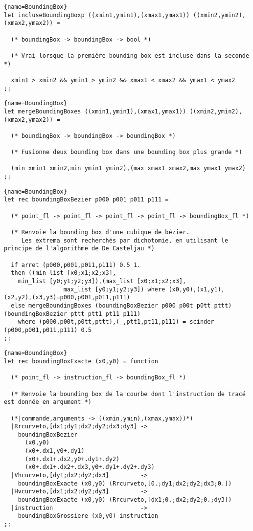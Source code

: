 \documentclass[10pt,twoside,a4paper]{article}
\begin{document}
\begin{lstlisting}{name=BoundingBox}
let incluseBoundingBoxp ((xmin1,ymin1),(xmax1,ymax1)) ((xmin2,ymin2),(xmax2,ymax2)) =

  (* boundingBox -> boundingBox -> bool *)

  (* Vrai lorsque la première bounding box est incluse dans la seconde *)
  
  xmin1 > xmin2 && ymin1 > ymin2 && xmax1 < xmax2 && ymax1 < ymax2
;;
\end{lstlisting}
\pagebreak
\begin{lstlisting}{name=BoundingBox}
let mergeBoundingBoxes ((xmin1,ymin1),(xmax1,ymax1)) ((xmin2,ymin2),(xmax2,ymax2)) =

  (* boundingBox -> boundingBox -> boundingBox *)

  (* Fusionne deux bounding box dans une bounding box plus grande *)
  
  (min xmin1 xmin2,min ymin1 ymin2),(max xmax1 xmax2,max ymax1 ymax2)
;;
\end{lstlisting}
\lstset{frame=single}
\begin{lstlisting}{name=BoundingBox}
let rec boundingBoxBezier p000 p001 p011 p111 =

  (* point_fl -> point_fl -> point_fl -> point_fl -> boundingBox_fl *)

  (* Renvoie la bounding box d'une cubique de bézier.
     Les extrema sont recherchés par dichotomie, en utilisant le principe de l'algorithme de De Casteljau *)
  
  if arret (p000,p001,p011,p111) 0.5 1.
  then ((min_list [x0;x1;x2;x3],
	min_list [y0;y1;y2;y3]),(max_list [x0;x1;x2;x3],
				 max_list [y0;y1;y2;y3]) where (x0,y0),(x1,y1),(x2,y2),(x3,y3)=p000,p001,p011,p111)
  else mergeBoundingBoxes (boundingBoxBezier p000 p00t p0tt pttt) (boundingBoxBezier pttt ptt1 pt11 p111)
    where (p000,p00t,p0tt,pttt),(_,ptt1,pt11,p111) = scinder (p000,p001,p011,p111) 0.5
;;
\end{lstlisting}
\lstset{frame=none}
\begin{lstlisting}{name=BoundingBox}
let rec boundingBoxExacte (x0,y0) = function

  (* point_fl -> instruction_fl -> boundingBox_fl *)

  (* Renvoie la bounding box de la courbe dont l'instruction de tracé est donnée en argument *)

  (*|commande,arguments -> ((xmin,ymin),(xmax,ymax))*)
  |Rrcurveto,[dx1;dy1;dx2;dy2;dx3;dy3] ->
    boundingBoxBezier
      (x0,y0)
      (x0+.dx1,y0+.dy1)
      (x0+.dx1+.dx2,y0+.dy1+.dy2)
      (x0+.dx1+.dx2+.dx3,y0+.dy1+.dy2+.dy3)
  |Vhcurveto,[dy1;dx2;dy2;dx3]         ->
    boundingBoxExacte (x0,y0) (Rrcurveto,[0.;dy1;dx2;dy2;dx3;0.])
  |Hvcurveto,[dx1;dx2;dy2;dy3]         ->
    boundingBoxExacte (x0,y0) (Rrcurveto,[dx1;0.;dx2;dy2;0.;dy3])
  |instruction                         ->
    boundingBoxGrossiere (x0,y0) instruction                             
;;
\end{lstlisting}
\end{document}
